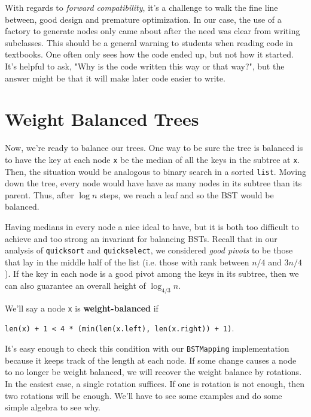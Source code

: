 With regards to \emph{forward compatibility}, it's a challenge to walk the fine line between, good design and premature optimization.
In our case, the use of a factory to generate nodes only came about after the need was clear from writing subclasses.
This should be a general warning to students when reading code in textbooks.
One often only sees how the code ended up, but not how it started.
It's helpful to ask, "Why is the code written this way or that way?", but the answer might be that it will make later code easier to write.

\section{Weight Balanced Trees}


Now, we're ready to balance our trees.
One way to be sure the tree is balanced is to have the key at each node \texttt{x} be the median of all the keys in the subtree at \texttt{x}.
Then, the situation would be analogous to binary search in a sorted \texttt{list}.
Moving down the tree, every node would have have as many nodes in its subtree than its parent.
Thus, after $\log n$ steps, we reach a leaf and so the BST would be balanced.


Having medians in every node a nice ideal to have, but it is both too difficult to achieve and too strong an invariant for balancing BSTs.
Recall that in our analysis of \texttt{quicksort} and \texttt{quickselect}, we considered \emph{good pivots} to be those that lay in the middle half of the list (i.e. those with rank between $n/4$ and $3n/4$).
If the key in each node is a good pivot among the keys in its subtree, then we can also guarantee an overall height of $\log_{4/3} n$.


We'll say a node \texttt{x} is \textbf{weight-balanced} if


\texttt{len(x) + 1 < 4 * (min(len(x.left), len(x.right)) +  1)}.


It's easy enough to check this condition with our \texttt{BSTMapping} implementation because it keeps track of the length at each node.
If some change causes a node to no longer be weight balanced, we will recover the weight balance by rotations.
In the easiest case, a single rotation suffices.
If one is rotation is not enough, then two rotations will be enough.
We'll have to see some examples and do some simple algebra to see why.


